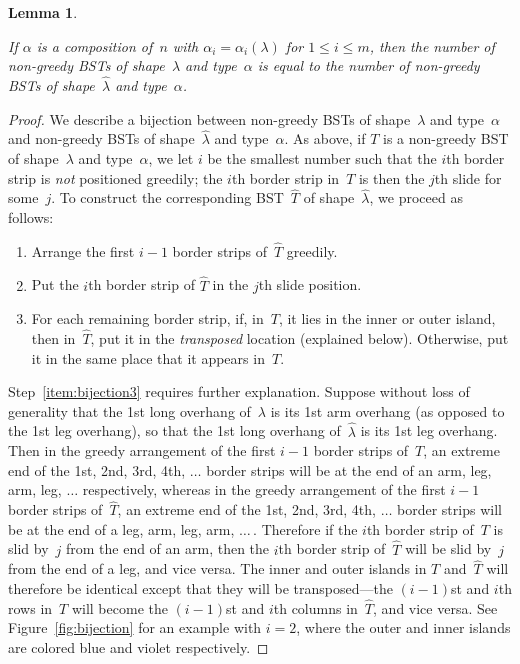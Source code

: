 \documentclass[12pt]{article}
\newtheorem{lemma}{Lemma}
\theoremstyle{definition}
\begin{document}
\begin{lemma}
\label{lem:nongreedy1}

If $\alpha$ is a composition of~$n$ with
$\alpha_i = \alpha_i(\lambda)$ for $1\le i \le m$, then the number of
non-greedy BSTs of shape~$\lambda$ and type~$\alpha$
is equal to the number of
non-greedy BSTs of shape~$\hat\lambda$ and type~$\alpha$.
\end{lemma}

\begin{proof}

We describe a bijection between
non-greedy BSTs of shape~$\lambda$ and type~$\alpha$ and
non-greedy BSTs of shape~$\hat\lambda$ and type~$\alpha$.
As above, if $T$ is a non-greedy BST of shape~$\lambda$
and type~$\alpha$, we let $i$ be the smallest number such that
the $i$th border strip is \emph{not} positioned greedily;
the $i$th border strip in~$T$ is then the $j$th slide for some~$j$.
To construct the corresponding BST~$\hat T$
of shape~$\hat \lambda$, we proceed as follows:
\begin{enumerate}
\item \label{item:bijection1} 
Arrange the first $i-1$ border strips of~$\hat T$ greedily.
\item \label{item:bijection2} 
Put the $i$th border strip of $\hat T$ in the $j$th slide position.
\item \label{item:bijection3} 
For each remaining border strip, if, in~$T$,
it lies in the inner or outer island, then in~$\hat T$,
put it in the \emph{transposed} location (explained below).
Otherwise, put it in the same place that it appears in~$T$.
\end{enumerate}
Step~\ref{item:bijection3} requires further explanation.
Suppose without loss of generality that the 1st long overhang
of~$\lambda$ is its 1st arm overhang (as opposed to the 1st leg overhang),
so that the 1st long overhang of~$\hat\lambda$ is its 1st leg overhang.
Then in the greedy arrangement of the first $i-1$ border strips of~$T$,
an extreme end of the 1st, 2nd, 3rd, 4th, $\ldots$
border strips will be at the end of an arm, leg, arm, leg, $\ldots$
respectively, whereas
in the greedy arrangement of the first $i-1$ border strips of~$\hat T$,
an extreme end of the 1st, 2nd, 3rd, 4th, $\ldots$
border strips will be at the end of a leg, arm, leg, arm, $\ldots\,$.
Therefore if the $i$th border strip of~$T$ is slid by~$j$ from the
end of an arm, then the $i$th border strip of~$\hat T$ will be slid
by~$j$ from the end of a leg, and vice versa.
The inner and outer islands in $T$ and~$\hat T$
will therefore be identical except that
they will be transposed---the $(i-1)$st and $i$th rows
in~$T$ will become the $(i-1)$st and $i$th columns in~$\hat T$,
and vice versa.  See Figure~\ref{fig:bijection} for an example with $i=2$,
where the outer and inner islands
are colored blue and violet respectively.


\end{proof}
\end{document}

